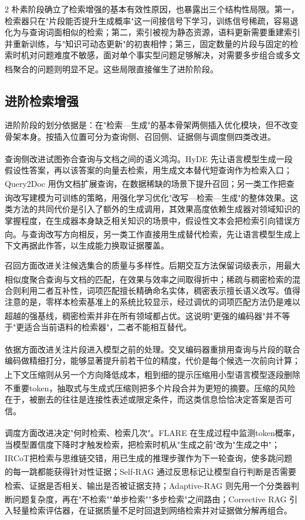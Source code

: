 \documentclass[10.5pt,compsoc,UTF8]{CjC}
\theoremstyle{mystyle}
\newcommand{\upcite}[1]{\textsuperscript{\cite{#1}}}
\begin{document}
\begin{multicols}{2}
朴素阶段确立了检索增强的基本有效性原因，也暴露出三个结构性局限。第一，检索器只在"片段能否提升生成概率"这一间接信号下学习，训练信号稀疏，容易退化为与查询词面相似的检索；第二，索引被视为静态资源，语料更新需要重建索引并重新训练，与"知识可动态更新"的初衷相悖；第三，固定数量的片段与固定的检索时机对问题难度不敏感，面对单个事实型问题足够解决，对需要多步组合或多文档聚合的问题则明显不足\upcite{chen2024benchmarking, trivedi2023interleaving}。这些局限直接催生了进阶阶段。

\subsection{\heiti 进阶检索增强}

进阶阶段的划分依据是：在"检索—生成"的基本骨架两侧插入优化模块，但不改变骨架本身。按插入位置可分为查询侧、召回侧、证据侧与调度侧四类改进。

查询侧改进试图弥合查询与文档之间的语义鸿沟。HyDE\upcite{gao2022precise} 先让语言模型生成一段假设性答案，再以该答案的向量去检索，用生成文本替代短查询作为检索入口；Query2Doc\upcite{wang2023query} 用伪文档扩展查询，在数据稀缺的场景下提升召回；另一类工作把查询改写建模为可训练的策略，用强化学习优化"改写—检索—生成"的整体效果\upcite{ma2023query}。这类方法的共同代价是引入了额外的生成调用，其效果高度依赖生成器对领域知识的掌握程度，在生成器本身缺乏相关知识的场景中，假设性文本会把检索引向错误方向。与查询改写方向相反，另一类工作直接用生成替代检索\upcite{yu2023generate}，先让语言模型生成上下文再据此作答，以生成能力换取证据覆盖。

召回方面改进关注候选集合的质量与多样性。后期交互方法保留词级表示，用最大相似度聚合查询与文档的匹配，在效果与效率之间取得折中\upcite{khattab2020colbert}；稀疏与稠密检索的混合则利用二者互补性，词项匹配擅长精确命名实体，稠密表示擅长语义改写。值得注意的是，零样本检索基准上的系统比较显示，经过调优的词项匹配方法仍是难以超越的强基线，稠密检索并非在所有领域都占优\upcite{thakur2021beir}。这说明"更强的编码器"并不等于"更适合当前语料的检索器"，二者不能相互替代。

依据方面改进关注片段进入模型之前的处理。交叉编码器重排\upcite{nogueira2019passage}用查询与片段的联合编码做精细打分，能够显著提升前若干位的精度，代价是每个候选一次前向计算；上下文压缩\upcite{jiang2023llmlingua}则从另一个方向降低成本，粗到细的提示压缩用小型语言模型逐段删除不重要token，抽取式与生成式压缩\upcite{xu2024recomp}则把多个片段合并为更短的摘要。压缩的风险在于，被删去的往往是连接性表述或限定条件，而这类信息恰恰决定答案是否可信。

调度方面改进决定"何时检索、检索几次"。FLARE \upcite{jiang2023active}在生成过程中监测token概率，当模型置信度下降时才触发检索，把检索时机从"生成之前"改为"生成之中"；IRCoT\upcite{trivedi2023interleaving}把检索与思维链交错，用已生成的推理步骤作为下一轮查询，使多跳问题的每一跳都能获得针对性证据；Self-RAG \upcite{asai2023self}通过反思标记让模型自行判断是否需要检索、证据是否相关、输出是否被证据支持；Adaptive-RAG\upcite{jeong2024adaptive} 则先用一个分类器判断问题复杂度，再在"不检索""单步检索""多步检索"之间路由；Corrective RAG\upcite{yan2024corrective} 引入轻量检索评估器，在证据质量不足时回退到网络检索并对证据做分解再组合。


\end{multicols}
\end{document}
